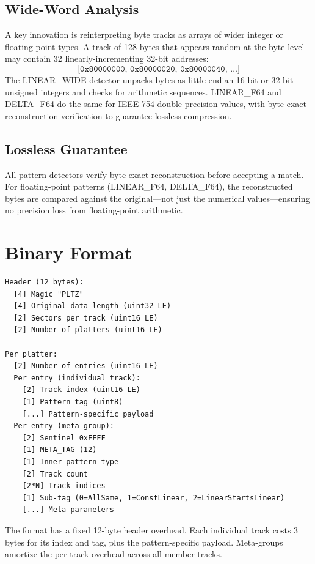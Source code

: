 \documentclass[11pt,a4paper]{article}
\begin{document}
\subsection{Wide-Word Analysis}

A key innovation is reinterpreting byte tracks as arrays of wider integer or floating-point types. A track of 128 bytes that appears random at the byte level may contain 32 linearly-incrementing 32-bit addresses:
\[
\texttt{[0x80000000, 0x80000020, 0x80000040, \ldots]}
\]
The LINEAR\_WIDE detector unpacks bytes as little-endian 16-bit or 32-bit unsigned integers and checks for arithmetic sequences. LINEAR\_F64 and DELTA\_F64 do the same for IEEE 754 double-precision values, with byte-exact reconstruction verification to guarantee lossless compression.

\subsection{Lossless Guarantee}

All pattern detectors verify byte-exact reconstruction before accepting a match. For floating-point patterns (LINEAR\_F64, DELTA\_F64), the reconstructed bytes are compared against the original---not just the numerical values---ensuring no precision loss from floating-point arithmetic.

\section{Binary Format}

\begin{lstlisting}
Header (12 bytes):
  [4] Magic "PLTZ"
  [4] Original data length (uint32 LE)
  [2] Sectors per track (uint16 LE)
  [2] Number of platters (uint16 LE)

Per platter:
  [2] Number of entries (uint16 LE)
  Per entry (individual track):
    [2] Track index (uint16 LE)
    [1] Pattern tag (uint8)
    [...] Pattern-specific payload
  Per entry (meta-group):
    [2] Sentinel 0xFFFF
    [1] META_TAG (12)
    [1] Inner pattern type
    [2] Track count
    [2*N] Track indices
    [1] Sub-tag (0=AllSame, 1=ConstLinear, 2=LinearStartsLinear)
    [...] Meta parameters
\end{lstlisting}

The format has a fixed 12-byte header overhead. Each individual track costs 3 bytes for its index and tag, plus the pattern-specific payload. Meta-groups amortize the per-track overhead across all member tracks.
\end{document}
